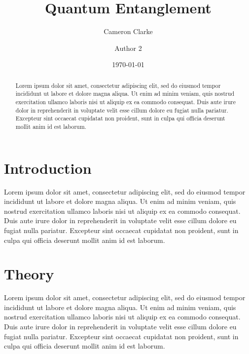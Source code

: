 \documentclass[%
reprint,
amsmath,amssymb,
pra,
nofootinbib,
floatfix
]{revtex4-1}
\begin{document}
	
	\title{Quantum Entanglement}

	\author{Cameron Clarke}
	\author{Author 2}%

	\date{\today}
	
	
	\begin{abstract}
		
	Lorem ipsum dolor sit amet, consectetur adipiscing elit, sed do eiusmod tempor incididunt ut labore et dolore magna aliqua. Ut enim ad minim veniam, quis nostrud exercitation ullamco laboris nisi ut aliquip ex ea commodo consequat. Duis aute irure dolor in reprehenderit in voluptate velit esse cillum dolore eu fugiat nulla pariatur. Excepteur sint occaecat cupidatat non proident, sunt in culpa qui officia deserunt mollit anim id est laborum.
	
	
	\end{abstract}
	
	
	\maketitle
	
	
	\section{\label{sec:intro} Introduction}
	
	Lorem ipsum dolor sit amet, consectetur adipiscing elit, sed do eiusmod tempor incididunt ut labore et dolore magna aliqua. Ut enim ad minim veniam, quis nostrud exercitation ullamco laboris nisi ut aliquip ex ea commodo consequat. Duis aute irure dolor in reprehenderit in voluptate velit esse cillum dolore eu fugiat nulla pariatur. Excepteur sint occaecat cupidatat non proident, sunt in culpa qui officia deserunt mollit anim id est laborum.

	
	\section{Theory}
	
	Lorem ipsum dolor sit amet, consectetur adipiscing elit, sed do eiusmod tempor incididunt ut labore et dolore magna aliqua. Ut enim ad minim veniam, quis nostrud exercitation ullamco laboris nisi ut aliquip ex ea commodo consequat. Duis aute irure dolor in reprehenderit in voluptate velit esse cillum dolore eu fugiat nulla pariatur. Excepteur sint occaecat cupidatat non proident, sunt in culpa qui officia deserunt mollit anim id est laborum.
	
\end{document}
